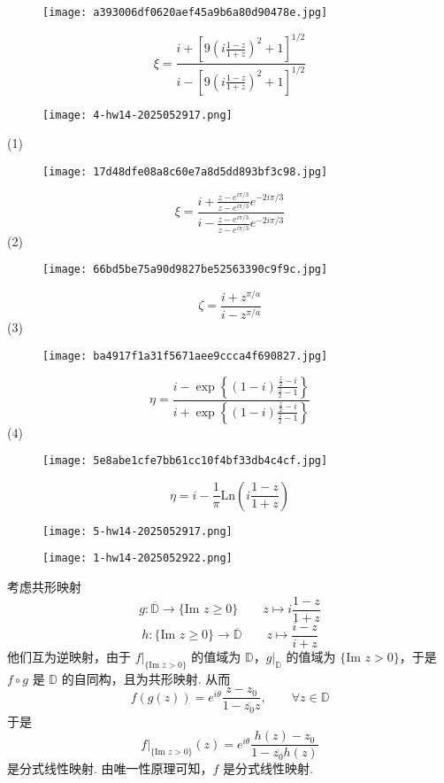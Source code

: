 \begin{figure}[H]
\centering
\texttt{[image: a393006df0620aef45a9b6a80d90478e.jpg]}
\label{}
\end{figure}
\[
\xi=\frac{i+\left[ 9\left( i\frac{1-z}{1+z} \right)^2+1 \right]^{1/2}}{i-\left[ 9\left( i\frac{1-z}{1+z} \right)^2+1 \right]^{1/2}}
\]
\begin{exercise}
\begin{figure}[H]
\centering
\texttt{[image: 4-hw14-2025052917.png]}
\label{}
\end{figure}
\end{exercise}
(1)
\begin{figure}[H]
\centering
\texttt{[image: 17d48dfe08a8c60e7a8d5dd893bf3c98.jpg]}
\label{}
\end{figure}
\[
\xi=\frac{i+\frac{z-e^{ i\pi/3  }}{z-e^{ i\pi/3 }}e^{ -2i\pi/3  }}{i-\frac{z-e^{ i\pi/3  }}{z-e^{ i\pi/3 }}e^{ -2i\pi/3  }}
\]
(2)
\begin{figure}[H]
\centering
\texttt{[image: 66bd5be75a90d9827be52563390c9f9c.jpg]}
\label{}
\end{figure}
\[
\zeta=\frac{i+z^{\pi/a }}{i-z^{\pi/a}}
\]
(3)
\begin{figure}[H]
\centering
\texttt{[image: ba4917f1a31f5671aee9ccca4f690827.jpg]}
\label{}
\end{figure}
\[
\eta=\frac{i-\exp \left\{  (1-i)\frac{\frac{z}{2}-i}{\frac{z}{2}-1}  \right\}}{i+\exp \left\{  (1-i)\frac{\frac{z}{2}-i}{\frac{z}{2}-1}  \right\}}
\]
(4)
\begin{figure}[H]
\centering
\texttt{[image: 5e8abe1cfe7bb61cc10f4bf33db4c4cf.jpg]}
\label{}
\end{figure}
\[
\eta=i-\frac{1}{\pi}\mathrm{Ln}\left( i\frac{1-z}{1+z} \right)
\]
\begin{exercise}
\begin{figure}[H]
\centering
\texttt{[image: 5-hw14-2025052917.png]}
\label{}
\end{figure}
\end{exercise}
\begin{figure}[H]
\centering
\texttt{[image: 1-hw14-2025052922.png]}
\label{}
\end{figure}

考虑共形映射
\[
g:\overline{\mathbb{D}}\to \{ \text{Im }z\geq 0 \}\qquad z\mapsto i\frac{1-z}{1+z}
\]
\[
h:\{ \text{Im }z\geq 0 \}\to \overline{\mathbb{D}}\qquad z\mapsto\frac{i-z}{i+z}
\]
他们互为逆映射，由于 $\left.f\right|_{\{ \text{Im }z>0 \}}$ 的值域为 $\mathbb{D}$，$\left.g\right|_{\mathbb{D}}$ 的值域为 $\{ \text{Im }z>0 \}$，于是 $f\circ g$ 是 $\mathbb{D}$ 的自同构，且为共形映射. 从而
\[
f(g(z))=e^{ i\theta }\frac{z-z_0}{1-\overline{z_0}z},\qquad \forall z\in \mathbb{D}
\]
于是
\[
\left.f\right|_{\{ \text{Im }z>0 \}}(z)=e^{ i\theta }\frac{h(z)-z_0}{1-\overline{z_0}h(z)}
\]
是分式线性映射. 由唯一性原理可知，$f$ 是分式线性映射.


